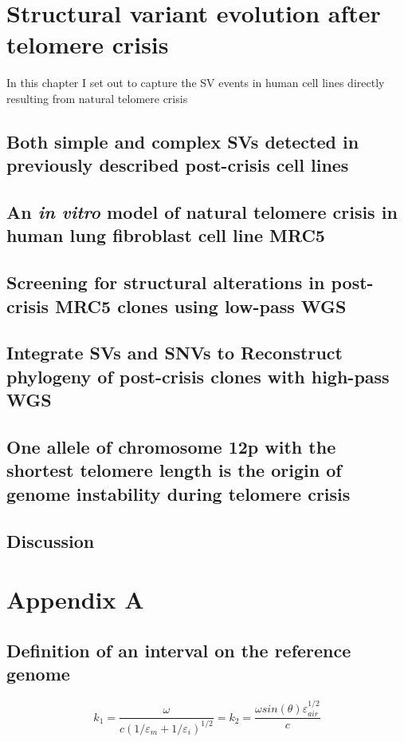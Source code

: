 \documentclass[phd,tocprelim]{cornell}
\begin{document}
\chapter{Structural variant evolution after telomere crisis}
In this chapter I set out to capture the SV events in human cell lines directly resulting from natural telomere crisis

\section{Both simple and complex SVs detected in previously described post-crisis cell lines}

\section{An \textit{in vitro} model of natural telomere crisis in human lung fibroblast cell line MRC5}

\section{Screening for structural alterations in post-crisis MRC5 clones using low-pass WGS}

\section{Integrate SVs and SNVs to Reconstruct phylogeny of post-crisis clones with high-pass WGS}

\section{One allele of chromosome 12p with the shortest telomere length is the origin of genome instability during telomere crisis}

\section{Discussion}

\appendix
\chapter{Appendix A}

\section{Definition of an interval on the reference genome}

\cite{aiw}

\begin{equation}
    k_1=\frac{\omega }{c({1/\varepsilon_m + 1/\varepsilon_i})^{1/2}}=k_2=\frac{\omega
    sin(\theta)\varepsilon_{air}^{1/2}}{c}
\end{equation}



\end{document}
